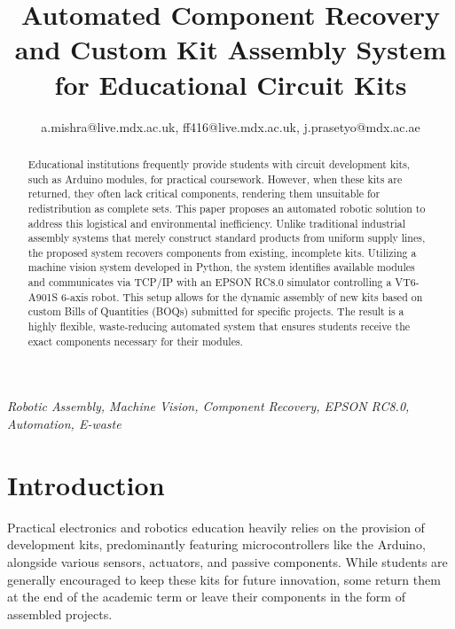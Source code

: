 \documentclass{MIPRO}
\begin{document}
\title{Automated Component Recovery and Custom Kit Assembly System for Educational Circuit Kits}

\author{


a.mishra@live.mdx.ac.uk, ff416@live.mdx.ac.uk, j.prasetyo@mdx.ac.ae
}

\maketitle

\begin{abstract}
Educational institutions frequently provide students with circuit development kits, such as Arduino modules, for practical coursework. However, when these kits are returned, they often lack critical components, rendering them unsuitable for redistribution as complete sets. This paper proposes an automated robotic solution to address this logistical and environmental inefficiency. Unlike traditional industrial assembly systems that merely construct standard products from uniform supply lines, the proposed system recovers components from existing, incomplete kits. Utilizing a machine vision system developed in Python, the system identifies available modules and communicates via TCP/IP with an EPSON RC8.0 simulator controlling a VT6-A901S 6-axis robot. This setup allows for the dynamic assembly of new kits based on custom Bills of Quantities (BOQs) submitted for specific projects. The result is a highly flexible, waste-reducing automated system that ensures students receive the exact components necessary for their modules.
\end{abstract}

\renewcommand\IEEEkeywordsname{Keywords}
\begin{IEEEkeywords}
\textit{Robotic Assembly, Machine Vision, Component Recovery, EPSON RC8.0, Automation, E-waste}
\end{IEEEkeywords}

\section{Introduction}

Practical electronics and robotics education heavily relies on the provision of development kits, predominantly featuring microcontrollers like the Arduino, alongside various sensors, actuators, and passive components. While students are generally encouraged to keep these kits for future innovation, some return them at the end of the academic term or leave their components in the form of assembled projects.
\end{document}
